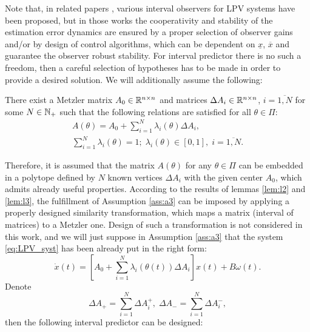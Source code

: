 Note that, in related papers \citep{AitRami2008,RVZ10,Bolajraf2011,Efimov_a2013,Efimov_tac2013,Chebotarev2015}, various interval observers for LPV systems have been proposed, but in those works the cooperativity and stability of the estimation error dynamics are ensured by a proper selection of observer gains and/or by design of control algorithms, which can be dependent on $\underline{x}$, $\overline{x}$ and guarantee the observer robust stability. For interval predictor there is no such a freedom, then a careful selection of hypotheses has to be made in order to provide a desired solution.
We will additionally assume the following:
\begin{assumption}
	\label{ass:a3}
	\begin{leftbar}[assumptionbar]
	There exist a Metzler matrix $A_{0}\in\mathbb{R}^{n\times n}$ and matrices $\Delta A_{i}\in\mathbb{R}^{n\times n}$, $i=\overline{1,N}$ for some $N\in\mathbb{N}_{+}$ such that the following relations are satisfied for all $\theta\in\Pi$:
	\begin{gather*}
	A(\theta)=A_{0}+\sum_{i=1}^{N}\lambda_{i}(\theta)\Delta A_{i},\\
	\sum_{i=1}^{N}\lambda_{i}(\theta)=1;\;\lambda_{i}(\theta)\in[0,1],\;i=\overline{1,N}.
	\end{gather*}
	\end{leftbar}
\end{assumption}
Therefore, it is assumed that the matrix $A(\theta)$ for any $\theta\in\Pi$ can be embedded in a polytope defined by $N$ known vertices $\Delta A_{i}$ with the given center $A_{0}$, which admits already useful properties. According to the results of lemmas \ref{lem:l2} and \ref{lem:l3}, the fulfillment of Assumption \ref{ass:a3} can be imposed by applying a properly designed similarity transformation, which maps a matrix (interval of matrices) to a Metzler one. Design of such a transformation is not considered in this work, and we will just suppose in Assumption \ref{ass:a3} that the system \eqref{eq:LPV_syst} has been already put in the right form:
\[
\dot{x}(t)=[A_{0}+\sum_{i=1}^{N}\lambda_{i}(\theta(t))\Delta A_{i}]x(t)+B\omega(t).
\]
Denote
\[
\Delta A_{+}=\sum_{i=1}^{N}\Delta A_{i}^{+},\;\Delta A_{-}=\sum_{i=1}^{N}\Delta A_{i}^{-},
\]
then the following interval predictor can be designed:
